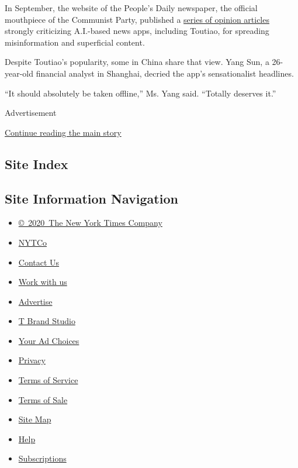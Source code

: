 In September, the website of the People's Daily newspaper, the official
mouthpiece of the Communist Party, published a
\href{http://opinion.people.com.cn/n1/2017/0918/c1003-29540709.html}{series
of opinion articles} strongly criticizing A.I.-based news apps,
including Toutiao, for spreading misinformation and superficial content.

Despite Toutiao's popularity, some in China share that view. Yang Sun, a
26-year-old financial analyst in Shanghai, decried the app's
sensationalist headlines.

``It should absolutely be taken offline,'' Ms. Yang said. ``Totally
deserves it.''

Advertisement

\protect\hyperlink{after-bottom}{Continue reading the main story}

\hypertarget{site-index}{%
\subsection{Site Index}\label{site-index}}

\hypertarget{site-information-navigation}{%
\subsection{Site Information
Navigation}\label{site-information-navigation}}

\begin{itemize}
\tightlist
\item
  \href{https://help.nytimes3xbfgragh.onion/hc/en-us/articles/115014792127-Copyright-notice}{©~2020~The
  New York Times Company}
\end{itemize}

\begin{itemize}
\tightlist
\item
  \href{https://www.nytco.com/}{NYTCo}
\item
  \href{https://help.nytimes3xbfgragh.onion/hc/en-us/articles/115015385887-Contact-Us}{Contact
  Us}
\item
  \href{https://www.nytco.com/careers/}{Work with us}
\item
  \href{https://nytmediakit.com/}{Advertise}
\item
  \href{http://www.tbrandstudio.com/}{T Brand Studio}
\item
  \href{https://www.nytimes3xbfgragh.onion/privacy/cookie-policy\#how-do-i-manage-trackers}{Your
  Ad Choices}
\item
  \href{https://www.nytimes3xbfgragh.onion/privacy}{Privacy}
\item
  \href{https://help.nytimes3xbfgragh.onion/hc/en-us/articles/115014893428-Terms-of-service}{Terms
  of Service}
\item
  \href{https://help.nytimes3xbfgragh.onion/hc/en-us/articles/115014893968-Terms-of-sale}{Terms
  of Sale}
\item
  \href{https://spiderbites.nytimes3xbfgragh.onion}{Site Map}
\item
  \href{https://help.nytimes3xbfgragh.onion/hc/en-us}{Help}
\item
  \href{https://www.nytimes3xbfgragh.onion/subscription?campaignId=37WXW}{Subscriptions}
\end{itemize}
